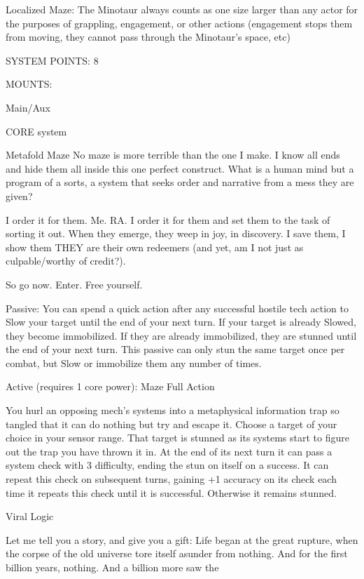  Localized Maze: The Minotaur always counts as one size larger than any actor for the purposes of
 grappling, engagement, or other actions (engagement stops them from moving, they cannot pass
 through the Minotaur’s space, etc)

                                             SYSTEM POINTS: 8

                                                   MOUNTS:

 Main/Aux

                                                 CORE system




                                                 Metafold Maze
 No maze is more terrible than the one I make. I know all ends and hide them all inside this one perfect
 construct. What is a human mind but a program of a sorts, a system that seeks order and narrative from
 a mess they are given?

 I order it for them. Me. RA. I order it for them and set them to the task of sorting it out. When they
 emerge, they weep in joy, in discovery. I save them, I show them THEY are their own redeemers (and
 yet, am I not just as culpable/worthy of credit?).

 So go now. Enter. Free yourself.

  Passive: You can spend a quick action after any successful hostile tech action to Slow your target until
 the end of your next turn. If your target is already Slowed, they become immobilized. If they are already
  immobilized, they are stunned until the end of your next turn. This passive can only stun the same
 target once per combat, but Slow or immobilize them any number of times.

 Active (requires 1 core power): Maze
  Full Action

 You hurl an opposing mech’s systems into a metaphysical information trap so tangled that it can do
  nothing but try and escape it. Choose a target of your choice in your sensor range. That target is
 stunned as its systems start to figure out the trap you have thrown it in. At the end of its next turn it can
  pass a system check with 3 difficulty, ending the stun on itself on a success. It can repeat this check on
 subsequent turns, gaining +1 accuracy on its check each time it repeats this check until it is successful.
 Otherwise it remains stunned.

Viral Logic


Let me tell you a story, and give you a gift: Life began at the great rupture, when the corpse of the old
universe tore itself asunder from nothing. And for the first billion years, nothing. And a billion more saw the

